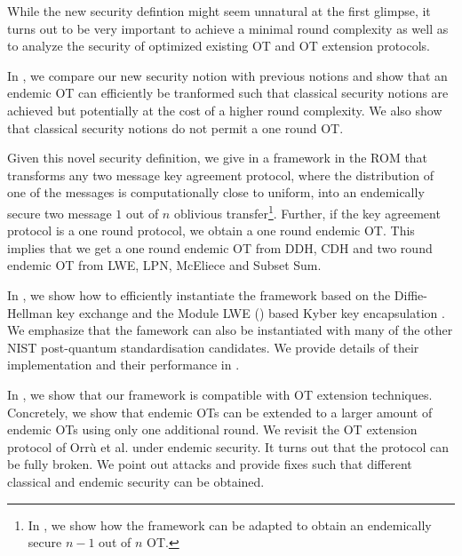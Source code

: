 While the new security defintion might seem unnatural at the first glimpse, it turns out to be very important to achieve a minimal round complexity as well as to analyze the security of optimized existing OT and OT extension protocols.

In , we compare our new security notion with previous notions and show that an endemic OT can efficiently  be tranformed such that classical security notions are achieved but potentially at the cost of a higher round complexity. We also show that classical security notions do not permit a one round OT.

Given this novel security definition, we give in  a framework in the ROM that transforms any two message key agreement protocol, where the distribution of one of the messages is computationally close to uniform, into an endemically secure two message $1$ out of $n$ oblivious transfer\footnote{In , we show how the framework can be adapted to obtain an endemically secure $n-1$ out of $n$ OT.}. Further, 
if the key agreement protocol is a one round protocol, we obtain a one round endemic OT. This implies that we get a one round endemic OT from DDH, CDH and two round endemic OT from LWE, LPN, McEliece and Subset Sum.

In , we show how to efficiently instantiate the framework based on the Diffie-Hellman key exchange and the Module LWE (\MLWE) based Kyber key encapsulation \cite{NISTPQC-R1:CRYSTALS-KYBER17}. We emphasize that the famework can also be instantiated with many of the other NIST post-quantum standardisation candidates. We provide details of their implementation and their performance in \sectionref{}.

In , we show that our framework is compatible with OT extension techniques. Concretely, we show that endemic OTs can be extended to a larger amount of endemic OTs using only one additional round. We revisit the OT extension protocol of Orr{\`u} et al. \cite{RSA:OrrOrsSch17} under endemic security. It turns out that the protocol can be fully broken. We point out attacks and provide fixes such that different classical and endemic security can be obtained. 


